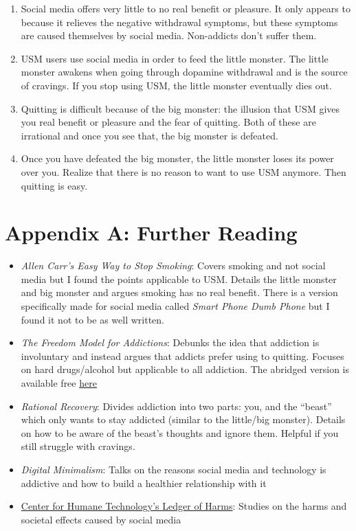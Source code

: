 \documentclass[
  openany]{book}
\providecommand{\tightlist}{%
  \setlength{\itemsep}{0pt}\setlength{\parskip}{0pt}}
\begin{document}
\begin{enumerate}
\def\labelenumi{\arabic{enumi}.}
\tightlist
\item
  Social media offers very little to no real benefit or pleasure. It only appears to because it relieves the negative withdrawal symptoms, but these symptoms are caused themselves by social media. Non-addicts don't suffer them.
\item
  USM users use social media in order to feed the little monster. The little monster awakens when going through dopamine withdrawal and is the source of cravings. If you stop using USM, the little monster eventually dies out.
\item
  Quitting is difficult because of the big monster: the illusion that USM gives you real benefit or pleasure and the fear of quitting. Both of these are irrational and once you see that, the big monster is defeated.
\item
  Once you have defeated the big monster, the little monster loses its power over you. Realize that there is no reason to want to use USM anymore. Then quitting is easy.
\end{enumerate}

\appendix


\chapter{Appendix A: Further Reading}\label{appendix-a-further-reading}

\begin{itemize}
\tightlist
\item
  \emph{Allen Carr's Easy Way to Stop Smoking}: Covers smoking and not social media but I found the points applicable to USM. Details the little monster and big monster and argues smoking has no real benefit. There is a version specifically made for social media called \emph{Smart Phone Dumb Phone} but I found it not to be as well written.
\item
  \emph{The Freedom Model for Addictions}: Debunks the idea that addiction is involuntary and instead argues that addicts prefer using to quitting. Focuses on hard drugs/alcohol but applicable to all addiction. The abridged version is available free \href{https://archive.org/details/freedom-model-abridged/Freedom\%20Model\%20Abridged/}{here}
\item
  \emph{Rational Recovery}: Divides addiction into two parts: you, and the ``beast'' which only wants to stay addicted (similar to the little/big monster). Details on how to be aware of the beast's thoughts and ignore them. Helpful if you still struggle with cravings.
\item
  \emph{Digital Minimalism}: Talks on the reasons social media and technology is addictive and how to build a healthier relationship with it
\item
  \href{https://ledger.humanetech.com/}{Center for Humane Technology's Ledger of Harms}: Studies on the harms and societal effects caused by social media
\end{itemize}
\end{document}
